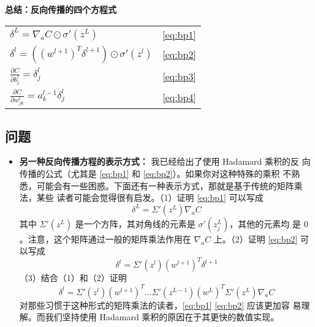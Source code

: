 \begin{center}
  \begin{minipage}{0.7\textwidth}
    \begin{center}
      \begin{framed}
        \textbf{总结：反向传播的四个方程式}\\
        \vspace{1.5ex}
        \begin{tabular}{ll}
          $\delta^L = \nabla_a C \odot \sigma'(z^L)$                  & \eqref{eq:bp1} \\[1.5ex]
          $\delta^l = ((w^{l+1})^T \delta^{l+1}) \odot \sigma'(z^l)$    & \eqref{eq:bp2} \\[1.5ex]
          $\frac{\partial C}{\partial b^l_j} = \delta^l_j$            & \eqref{eq:bp3} \\[1.5ex]
          $\frac{\partial C}{\partial w^l_{jk}} = a^{l-1}_k \delta^l_j$ & \eqref{eq:bp4}
        \end{tabular}
      \end{framed}
    \end{center}
  \end{minipage}
\end{center}

\subsection*{问题}

\begin{itemize}
\item \textbf{另一种反向传播方程的表示方式：} 我已经给出了使用 Hadamard 乘积的反
  向传播的公式（尤其是 \eqref{eq:bp1} 和 \eqref{eq:bp2}）。如果你对这种特殊的乘积
  不熟悉，可能会有一些困惑。下面还有一种表示方式，那就是基于传统的矩阵乘法，某些
  读者可能会觉得很有启发。（1）证明 \eqref{eq:bp1} 可以写成
  \begin{equation}
    \delta^L = \Sigma'(z^L) \nabla_a C
    \label{eq:33}\tag{33}
  \end{equation}
  其中 $\Sigma'(z^L)$ 是一个方阵，其对角线的元素是 $\sigma'(z_j^L)$，其他的元素均
  是 $0$。注意，这个矩阵通过一般的矩阵乘法作用在 $\nabla_a C$ 上。（2）证明 \eqref{eq:bp2} 可
  以写成
  \begin{equation}
    \delta^l = \Sigma'(z^l) (w^{l+1})^T \delta^{l+1}
    \label{eq:34}\tag{34}
  \end{equation}
  （3）结合（1）和（2）证明
  \begin{equation}
    \delta^l = \Sigma'(z^l) (w^{l+1})^T \ldots \Sigma'(z^{L-1}) (w^L)^T 
    \Sigma'(z^L) \nabla_a C
    \label{eq:35}\tag{35}
  \end{equation}
  对那些习惯于这种形式的矩阵乘法的读者，\eqref{eq:bp1} \eqref{eq:bp2} 应该更加容
  易理解。而我们坚持使用 Hadamard 乘积的原因在于其更快的数值实现。
\end{itemize}

